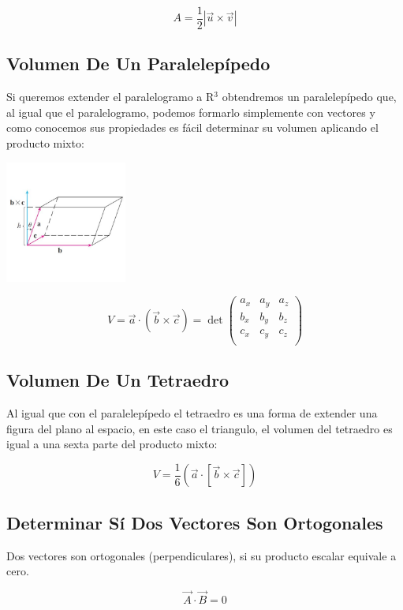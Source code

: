 \documentclass{article}
\begin{document}
\[
A = \frac{1}{2}|\vec{u}\times\vec{v}|
\]

\subsection{Volumen De Un Paralelepípedo}
\label{sec:org38de770}
Si queremos extender el paralelogramo a R\(^{\text{3}}\) obtendremos un paralelepípedo que, al igual que el paralelogramo, podemos formarlo simplemente con vectores y como conocemos sus propiedades es fácil determinar su volumen aplicando el producto mixto:

\begin{center}
\includegraphics[width=4cm]{img/paralelipedo.png}
\end{center}

\[
V = \vec{a}\cdot(\vec{b}\times\vec{c}) = \det\begin{pmatrix}
  a_x & a_y & a_z \\
  b_x & b_y & b_z \\
  c_x & c_y & c_z \\
\end{pmatrix}
\]

\subsection{Volumen De Un Tetraedro}
\label{sec:org1aef20b}
Al igual que con el paralelepípedo el tetraedro es una forma de extender una figura del plano al espacio, en este caso el triangulo, el volumen del tetraedro es igual a una sexta parte del producto mixto:

\[
V = \frac{1}{6} \left( \vec{a}\cdot\left[\vec{b}\times\vec{c}\right] \right)
\]

\subsection{Determinar Sí Dos Vectores Son Ortogonales}
\label{sec:orgf41d1c2}
Dos vectores son ortogonales (perpendiculares), si su producto escalar equivale a cero.

\[
\vec{A} \cdot \vec{B} = 0
\]
\end{document}
